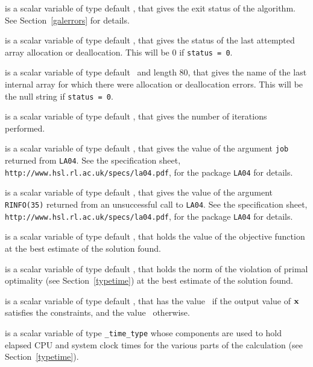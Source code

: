 \begin{description}

 is a scalar variable of type default \integer, that gives the
exit status of the algorithm.
See Section~\ref{galerrors}
for details.

 is a scalar variable of type default \integer, that gives
the status of the last attempted array allocation or deallocation.
This will be 0 if {\tt status = 0}.

 is a scalar variable of type default \character\
and length 80, that  gives the name of the last internal array
for which there were allocation or deallocation errors.
This will be the null string if {\tt status = 0}.

 is a scalar variable of type default \integer, that
gives the number of iterations performed.

 is a scalar variable of type default \integer, that
gives the value of the argument {\tt job} returned from {\tt LA04}.
See the specification sheet,
{\tt http://www.hsl.rl.ac.uk/specs/la04.pdf},
for the package {\tt LA04} for details.

 is a scalar variable of type default \integer, that
gives the value of the argument {\tt RINFO(35)} returned from an
unsuccessful call to {\tt LA04}.
See the specification sheet,
{\tt http://www.hsl.rl.ac.uk/specs/la04.pdf},
for the package {\tt LA04} for details.

 is a scalar variable of type default \realdp, that holds the
value of the objective function at the best estimate of the solution found.

 is a scalar variable of type default \realdp,
that holds the norm of the violation of primal optimality
(see Section~\ref{typetime}) at the best estimate of the solution found.

 is a scalar variable of type default \logical, that has the
value \true\ if the output value of ${\mathbf{x}}$ satisfies the constraints,
and the value \false\ otherwise.

 is a scalar variable of type {\tt \packagename\_time\_type}
whose components are used to hold elapsed CPU and system clock times for the
various parts of the calculation (see Section~\ref{typetime}).

\end{description}
